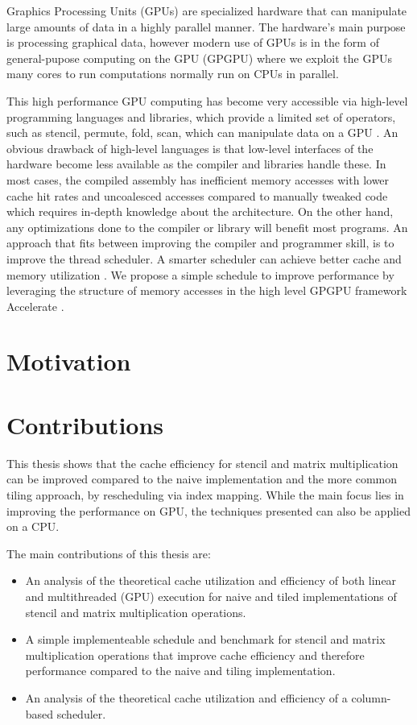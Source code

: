 Graphics Processing Units (GPUs) are specialized hardware that can manipulate large amounts of data in a highly parallel manner.
The hardware's main purpose is processing graphical data, however modern use of GPUs is in the form of general-pupose computing on the GPU (GPGPU) where we exploit the GPUs many cores to run computations normally run on CPUs in parallel.

This high performance GPU computing has become very accessible via high-level programming languages and libraries, which provide a limited set of operators, such as stencil, permute, fold, scan, which can manipulate data on a GPU \cite{chakravarty2011accelerating}.
An obvious drawback of high-level languages is that low-level interfaces of the hardware become less available as the compiler and libraries handle these.
In most cases, the compiled assembly has inefficient memory accesses with lower cache hit rates and uncoalesced accesses compared to manually tweaked code which requires in-depth knowledge about the architecture.
On the other hand, any optimizations done to the compiler or library will benefit most programs.
An approach that fits between improving the compiler and programmer skill, is to improve the thread scheduler.
A smarter scheduler can achieve better cache and memory utilization \cite{nugteren2014study}.
We propose a simple schedule to improve performance by leveraging the structure of memory accesses in the high level GPGPU framework Accelerate \cite{chakravarty2011accelerating}.

\section{Motivation}

\section{Contributions}
This thesis shows that the cache efficiency for stencil and matrix multiplication can be improved compared to the naive implementation and the more common tiling approach, by rescheduling via index mapping.
While the main focus lies in improving the performance on GPU, the techniques presented can also be applied on a CPU.

\vspace{1em}
The main contributions of this thesis are:
\begin{itemize}
    \item An analysis of the theoretical cache utilization and efficiency of both linear and multithreaded (GPU) execution for naive and tiled implementations of stencil and matrix multiplication operations.
    \item A simple implementeable schedule and benchmark for stencil and matrix multiplication operations that improve cache efficiency and therefore performance compared to the naive and tiling implementation.
    \item An analysis of the theoretical cache utilization and efficiency of a column-based scheduler.
\end{itemize}

